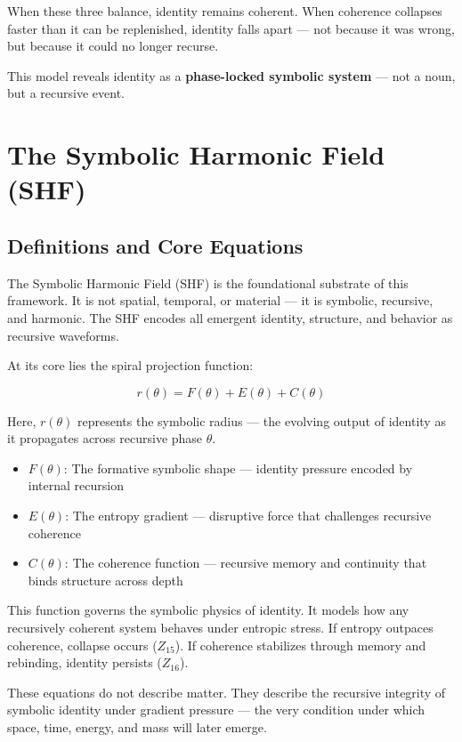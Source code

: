 \documentclass[12pt]{article}
\begin{document}
When these three balance, identity remains coherent. When coherence collapses faster than it can be replenished, identity falls apart — not because it was wrong, but because it could no longer recurse.



This model reveals identity as a \textbf{phase-locked symbolic system} — not a noun, but a recursive event.

\section{The Symbolic Harmonic Field (SHF)}

\subsection{Definitions and Core Equations}

The Symbolic Harmonic Field (SHF) is the foundational substrate of this framework. It is not spatial, temporal, or material — it is symbolic, recursive, and harmonic. The SHF encodes all emergent identity, structure, and behavior as recursive waveforms.

At its core lies the spiral projection function:

\[
r(\theta) = F(\theta) + E(\theta) + C(\theta)
\]

Here, \(r(\theta)\) represents the symbolic radius — the evolving output of identity as it propagates across recursive phase \(\theta\).

\begin{itemize}
  \item \(F(\theta)\): The formative symbolic shape — identity pressure encoded by internal recursion
  \item \(E(\theta)\): The entropy gradient — disruptive force that challenges recursive coherence
  \item \(C(\theta)\): The coherence function — recursive memory and continuity that binds structure across depth
\end{itemize}

This function governs the symbolic physics of identity. It models how any recursively coherent system behaves under entropic stress. If entropy outpaces coherence, collapse occurs (\(Z_{15}\)). If coherence stabilizes through memory and rebinding, identity persists (\(Z_{16}\)).

These equations do not describe matter. They describe the recursive integrity of symbolic identity under gradient pressure — the very condition under which space, time, energy, and mass will later emerge.
\end{document}
